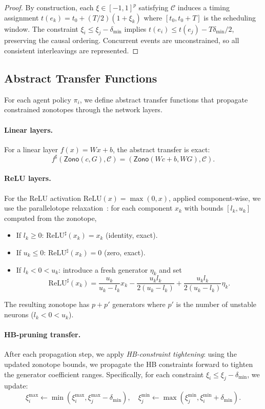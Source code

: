 \documentclass[11pt]{article}
\newcommand{\calC}{\mathcal{C}}
\newcommand{\zo}{\mathsf{Zono}}
\begin{document}
\begin{proof}
By construction, each $\xi \in [-1,1]^p$ satisfying $\calC$ induces a
timing assignment $t(e_k) = t_0 + (T/2)(1 + \xi_k)$ where $[t_0, t_0+T]$
is the scheduling window. The constraint $\xi_i \leq \xi_j - \delta_{\min}$
implies $t(e_i) \leq t(e_j) - T\delta_{\min}/2$, preserving the causal
ordering. Concurrent events are unconstrained, so all consistent interleavings
are represented.
\end{proof}

\subsection{Abstract Transfer Functions}

For each agent policy $\pi_i$, we define abstract transfer functions
that propagate constrained zonotopes through the network layers.

\paragraph{Linear layers.}
For a linear layer $f(x) = Wx + b$, the abstract transfer is exact:
\[
  f^\sharp(\zo(c, G), \calC) = (\zo(Wc + b, WG), \calC).
\]

\paragraph{ReLU layers.}
For the ReLU activation $\mathrm{ReLU}(x) = \max(0, x)$, applied
component-wise, we use the parallelotope relaxation~\cite{singh2019abstract}:
for each component $x_k$ with bounds $[l_k, u_k]$ computed from the zonotope,
\begin{itemize}[nosep]
\item If $l_k \geq 0$: $\mathrm{ReLU}^\sharp(x_k) = x_k$ (identity, exact).
\item If $u_k \leq 0$: $\mathrm{ReLU}^\sharp(x_k) = 0$ (zero, exact).
\item If $l_k < 0 < u_k$: introduce a fresh generator $\eta_k$ and set
\[
  \mathrm{ReLU}^\sharp(x_k) = \frac{u_k}{u_k - l_k} x_k
  - \frac{u_k l_k}{2(u_k - l_k)} + \frac{u_k l_k}{2(u_k - l_k)} \eta_k.
\]
\end{itemize}

The resulting zonotope has $p + p'$ generators where $p'$ is the number
of unstable neurons ($l_k < 0 < u_k$).

\paragraph{HB-pruning transfer.}
After each propagation step, we apply \emph{HB-constraint tightening}:
using the updated zonotope bounds, we propagate the HB constraints forward
to tighten the generator coefficient ranges. Specifically, for each
constraint $\xi_i \leq \xi_j - \delta_{\min}$, we update:
\[
  \xi_i^{\max} \leftarrow \min(\xi_i^{\max}, \xi_j^{\max} - \delta_{\min}),
  \quad
  \xi_j^{\min} \leftarrow \max(\xi_j^{\min}, \xi_i^{\min} + \delta_{\min}).
\]
\end{document}
